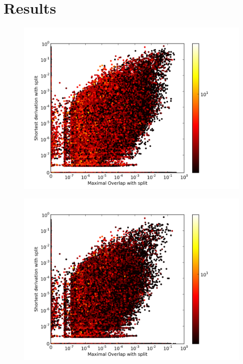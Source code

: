 \section{Results}\label{sec:Results}

\begin{figure}
\center
\includegraphics[width=\linewidth]{../data/plots/plot0.png}
\end{figure}


\begin{figure}
\center
\includegraphics[width=\linewidth]{../data/plots/plot1.png}
\end{figure}


